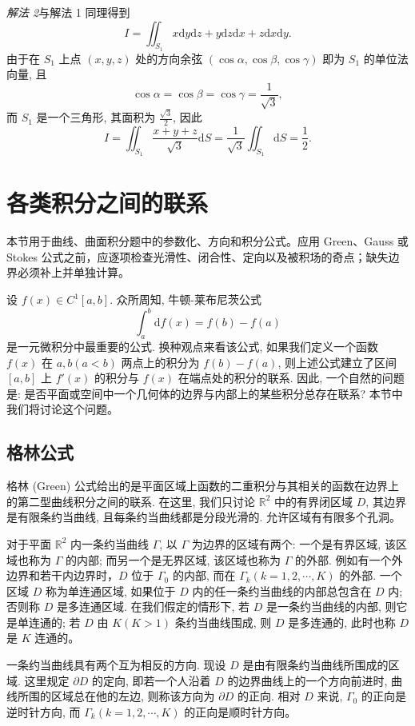 \documentclass[UTF8,12pt,a4paper,fontset=fandol]{ctexart}
\begin{document}
\noindent\emph{解法 2}\quad 与解法 1 同理得到
\[
  I=\iint_{S_1}x\mathrm dy\mathrm dz+y\mathrm dz\mathrm dx+z\mathrm dx\mathrm dy.
\]
由于在 $S_1$ 上点 $(x,y,z)$ 处的方向余弦 $(\cos\alpha,\cos\beta,\cos\gamma)$ 即为 $S_1$ 的单位法向量, 且
\[
  \cos\alpha=\cos\beta=\cos\gamma=\frac1{\sqrt3},
\]
而 $S_1$ 是一个三角形, 其面积为 $\frac{\sqrt3}{2}$, 因此
\[
  I=\iint_{S_1}\frac{x+y+z}{\sqrt3}\mathrm dS
  =\frac1{\sqrt3}\iint_{S_1}\mathrm dS=\frac12.
\]



\section{各类积分之间的联系}\label{course-16-5}
本节用于曲线、曲面积分题中的参数化、方向和积分公式。应用 Green、Gauss 或 Stokes 公式之前，应逐项检查光滑性、闭合性、定向以及被积场的奇点；缺失边界必须补上并单独计算。

设 $f(x)\in C^1[a,b]$. 众所周知, 牛顿-莱布尼茨公式
\[
  \int_a^b\mathrm df(x)=f(b)-f(a)
\]
是一元微积分中最重要的公式. 换种观点来看该公式, 如果我们定义一个函数 $f(x)$ 在 $a,b(a<b)$ 两点上的积分为 $f(b)-f(a)$, 则上述公式建立了区间 $[a,b]$ 上 $f'(x)$ 的积分与 $f(x)$ 在端点处的积分的联系. 因此, 一个自然的问题是: 是否平面或空间中一个几何体的边界与内部上的某些积分总存在联系? 本节中我们将讨论这个问题。

\subsection{格林公式}

格林 (Green) 公式给出的是平面区域上函数的二重积分与其相关的函数在边界上的第二型曲线积分之间的联系. 在这里, 我们只讨论 $\mathbb R^2$ 中的有界闭区域 $D$, 其边界是有限条约当曲线, 且每条约当曲线都是分段光滑的. 允许区域有有限多个孔洞。

对于平面 $\mathbb R^2$ 内一条约当曲线 $\Gamma$, 以 $\Gamma$ 为边界的区域有两个: 一个是有界区域, 该区域也称为 $\Gamma$ 的内部; 而另一个是无界区域, 该区域也称为 $\Gamma$ 的外部. 例如有一个外边界和若干内边界时，$D$ 位于 $\Gamma_0$ 的内部, 而在 $\Gamma_k(k=1,2,\cdots,K)$ 的外部. 一个区域 $D$ 称为单连通区域, 如果位于 $D$ 内的任一条约当曲线的内部总包含在 $D$ 内; 否则称 $D$ 是多连通区域. 在我们假定的情形下, 若 $D$ 是一条约当曲线的内部, 则它是单连通的; 若 $D$ 由 $K(K>1)$ 条约当曲线围成, 则 $D$ 是多连通的, 此时也称 $D$ 是 $K$ 连通的。

一条约当曲线具有两个互为相反的方向. 现设 $D$ 是由有限条约当曲线所围成的区域. 这里规定 $\partial D$ 的定向, 即若一个人沿着 $D$ 的边界曲线上的一个方向前进时, 曲线所围的区域总在他的左边, 则称该方向为 $\partial D$ 的正向. 相对 $D$ 来说, $\Gamma_0$ 的正向是逆时针方向, 而 $\Gamma_k(k=1,2,\cdots,K)$ 的正向是顺时针方向。
\end{document}
